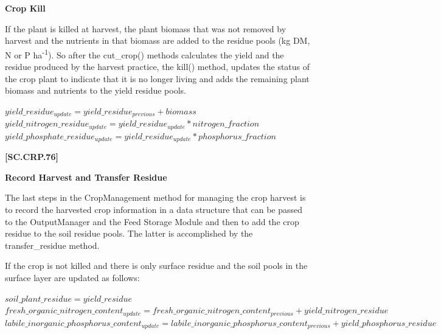 \textbf{Crop Kill}
\vspace{0.2cm}

If the plant is killed at harvest, the plant biomass that was not removed by harvest and the nutrients in that biomass are added to the residue pools (kg DM, N or P ha\textsuperscript{-1}). So after the cut\_crop() methods calculates the yield and the residue produced by the harvest practice, the kill() method, updates the status of the crop plant to indicate that it is no longer living and adds the remaining plant biomass and nutrients to the yield residue pools.
   \vspace{0.2cm}

    \begin{center}
        \(yield\_residue_{update}=yield\_residue_{previous} + biomass\)\\ 
        \(yield\_nitrogen\_residue_{update}=yield\_residue_{update} * nitrogen\_fraction\) \\
        \(yield\_phosphate\_residue_{update}=yield\_residue_{update} * phosphorus\_fraction\)
    \end{center}
        \vspace{0.5cm}
    
            {\raggedleft \textbf{[SC.CRP.76]}\par}
            \vspace{0.5cm}

\textbf{Record Harvest and Transfer Residue}
\vspace{0.2cm}

The last steps in the CropManagement method for managing the crop harvest is to record the harvested crop information in a data structure that can be passed to the OutputManager and the Feed Storage Module and then to add the crop residue to the soil residue pools. The latter is accomplished by the transfer\_residue method. 

If the crop is not killed and there is only surface residue and the soil pools in the surface layer are updated as follows:
   \vspace{0.2cm}

    \begin{center}
        \(soil\_plant\_residue=yield\_residue \)\\ 
    \(fresh\_organic\_nitrogen\_content_{update}=fresh\_organic\_nitrogen\_content_{previous} +yield\_nitrogen\_residue\) \\
    \(labile\_inorganic\_phosphorus\_content_{update}=labile\_inorganic\_phosphorus\_content_{previous} +yield\_phosphorus\_residue\)
    \end{center}
        \vspace{0.5cm}
    
